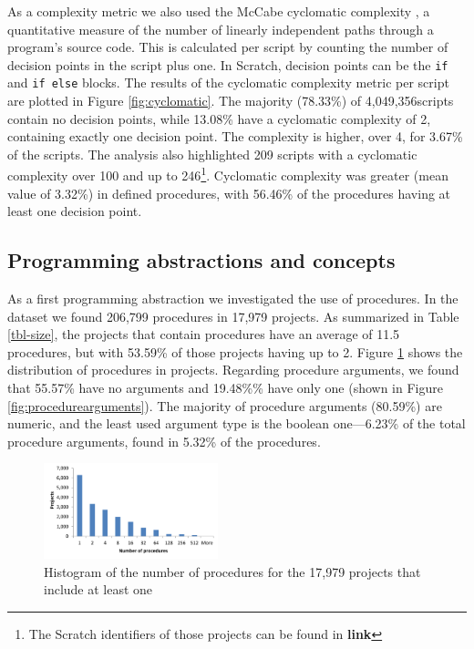 \documentclass{sig-alternate}
\newcommand{\nscripts}{4,049,356}
\newcommand{\todo}[1]{\textbf{#1}}
\begin{document}
As a complexity metric we also used the McCabe cyclomatic complexity \cite{mcCabe76},  a quantitative measure of the number of linearly independent paths through a program's source code. This is calculated per script by counting the number of decision points in the script plus one. In Scratch, decision points can be the \texttt{if} and \texttt{if else} blocks. The results of the cyclomatic complexity metric per script are plotted in Figure \ref{fig:cyclomatic}. The majority (78.33\%) of \nscripts scripts contain no decision points, while 13.08\% have a cyclomatic complexity of 2, containing exactly one decision point. The complexity is higher, over 4, for 3.67\% of the scripts. The analysis also highlighted 209 scripts with a cyclomatic complexity over 100 and up to 246\footnote{The Scratch identifiers of those projects can be found in \todo{link}}. Cyclomatic complexity was greater (mean value of 3.32\%) in defined procedures, with 56.46\% of the procedures having at least one decision point.

\noindent
{}

\subsection{Programming abstractions and concepts}

As a first programming abstraction we investigated the use of procedures. In the dataset we found 206,799 procedures in 17,979 projects. As summarized in Table \ref{tbl-size}, the projects that contain procedures have an average of 11.5 procedures, but with 53.59\% of those projects having up to 2. Figure \ref{fig:proceduresperproject} shows the distribution of procedures in projects. Regarding procedure arguments, we found that 55.57\% have no arguments and 19.48\%\% have only one (shown in Figure \ref{fig:procedurearguments}). The majority of procedure arguments (80.59\%) are numeric, and the least used argument type is the boolean one---6.23\% of the total procedure arguments, found in 5.32\% of the procedures.

\begin{figure}
	\centering
	\includegraphics[width=0.45\textwidth]{fig/charts/6proceduresperproject}
	\caption{Histogram of the number of procedures for the 17,979 projects that include at least one}
	\label{fig:proceduresperproject}
\end{figure}
\end{document}
